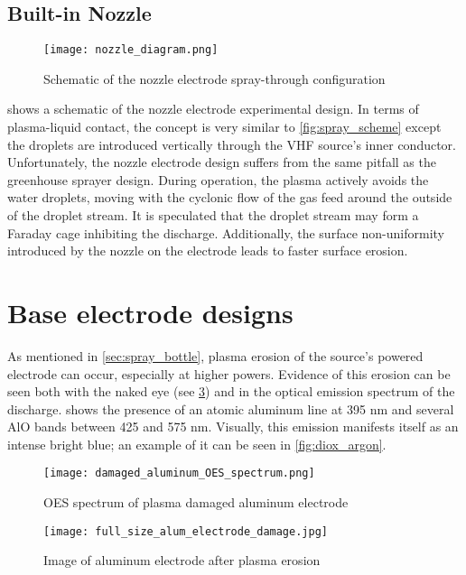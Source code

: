 \subsection{Built-in Nozzle}

\begin{figure}[htbp]
  \centering
  \texttt{[image: nozzle\_diagram.png]}
  \caption{Schematic of the nozzle electrode spray-through configuration}
  \label{fig:nozzle}
\end{figure}

 shows a schematic of the nozzle electrode experimental design. In terms of plasma-liquid contact, the concept is very similar to \cref{fig:spray_scheme} except the droplets are introduced vertically through the VHF source's inner conductor. Unfortunately, the nozzle electrode design suffers from the same pitfall as the greenhouse sprayer design. During operation, the plasma actively avoids the water droplets, moving with the cyclonic flow of the gas feed around the outside of the droplet stream. It is speculated that the droplet stream may form a Faraday cage inhibiting the discharge. Additionally, the surface non-uniformity introduced by the nozzle on the electrode leads to faster surface erosion.

\section{Base electrode designs}
\label{sec:electrodes}

As mentioned in \cref{sec:spray_bottle}, plasma erosion of the source's powered electrode can occur, especially at higher powers. Evidence of this erosion can be seen both with the naked eye (see \cref{fig:alum_damage_full}) and in the optical emission spectrum of the discharge.  shows the presence of an atomic aluminum line at 395 nm and several AlO bands between 425 and 575 nm. Visually, this emission manifests itself as an intense bright blue; an example of it can be seen in \cref{fig:diox_argon}.

\begin{figure}[htbp]
  \centering
  \texttt{[image: damaged\_aluminum\_OES\_spectrum.png]}
  \caption{OES spectrum of plasma damaged aluminum electrode}
  \label{fig:OES_alum_damage}
\end{figure}

\begin{figure}[htbp]
  \centering
  \texttt{[image: full\_size\_alum\_electrode\_damage.jpg]}
  \caption{Image of aluminum electrode after plasma erosion}
  \label{fig:alum_damage_full}
\end{figure}

